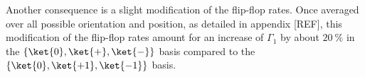 \documentclass[a4paper, 11pt]{book}
\begin{document}
Another consequence is a slight modification of the flip-flop rates. Once averaged over all possible orientation and position, as detailed in appendix [REF], this modification of the flip-flop rates amount for an increase of $\Gamma_1$ by about $20\ \%$ in the $\{ \ket{0}, \ket{+},\ket{-} \}$ basis compared to the $\{ \ket{0}, \ket{+1},\ket{-1} \}$ basis.
%
%
%
%
\end{document}
